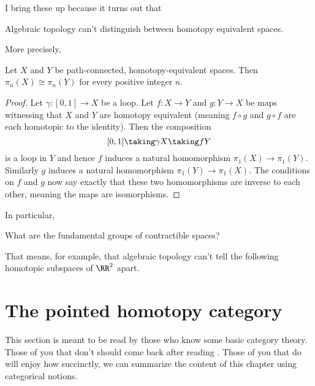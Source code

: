 I bring these up because it turns out that 
\begin{moral}
	Algebraic topology can't distinguish between homotopy equivalent spaces.
\end{moral}
More precisely,
\begin{theorem}
	\label{thm:fundgrp_homotopy_invariant}
	Let $X$ and $Y$ be path-connected, homotopy-equivalent spaces.
	Then $\pi_n(X) \cong \pi_n(Y)$ for every positive integer $n$.
\end{theorem}
\begin{proof}
	Let $\gamma : [0,1] \to X$ be a loop.
	Let $f : X \to Y$ and $g : Y \to X$ be maps witnessing that $X$ and $Y$ are homotopy equivalent
	(meaning $f \circ g$ and $g \circ f$ are each homotopic to the identity).
	Then the composition
	\[ [0,1] \taking\gamma X \taking f Y \]
	is a loop in $Y$ and hence $f$ induces a natural homomorphism $\pi_1(X) \to \pi_1(Y)$.
	Similarly $g$ induces a natural homomorphism $\pi_1(Y) \to \pi_1(X)$.
	The conditions on $f$ and $g$ now say exactly that these two homomorphisms
	are inverse to each other, meaning the maps are isomorphisms.
\end{proof}
In particular,
\begin{ques}
	What are the fundamental groups of contractible spaces?
\end{ques}

That means, for example, that algebraic topology can't tell the following homotopic subspaces of $\RR^2$ apart.
\begin{center}
	{\color{red} \Huge \venus}
	\qquad
	{\color{blue} \Huge \mars}
\end{center}

\section{The pointed homotopy category}
This section is meant to be read by those who know some basic category theory.
Those of you that don't should come back after reading .
Those of you that do will enjoy how succinctly, we can summarize
the content of this chapter using categorical notions.

